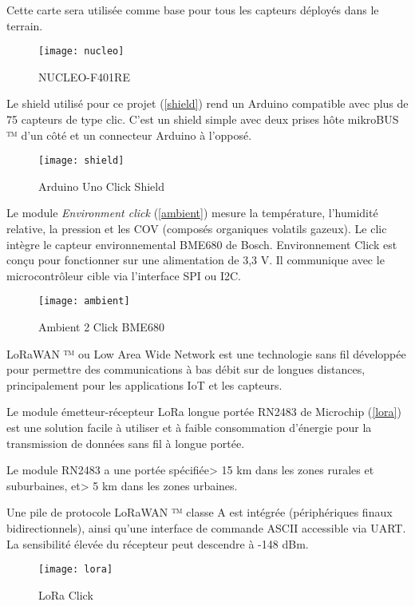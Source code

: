 Cette carte sera utilisée comme base pour tous les capteurs déployés dans le terrain.

\begin{figure}[!h]
	\centering
	\texttt{[image: nucleo]}
	\caption{NUCLEO-F401RE}
	\label{nucleo}
\end{figure}

\newpage
Le shield utilisé pour ce projet (\autoref{shield}) rend un Arduino compatible avec plus de 75 capteurs de type clic. C'est un shield simple avec deux prises hôte mikroBUS ™ d'un côté et un connecteur Arduino à l'opposé.

\begin{figure}[!h]
	\centering
	\texttt{[image: shield]}
	\caption{Arduino Uno Click Shield}
	\label{shield}
\end{figure}

Le module \textit{Environment click} (\autoref{ambient}) mesure la température, l'humidité relative, la pression et les COV (composés organiques volatils gazeux). Le clic intègre le capteur environnemental BME680 de Bosch. Environnement Click est conçu pour fonctionner sur une alimentation de 3,3 V. Il communique avec le microcontrôleur cible via l'interface SPI ou I2C.

\begin{figure}[!h]
	\centering
	\texttt{[image: ambient]}
	\caption{Ambient 2 Click BME680}
	\label{ambient}
\end{figure}

\newpage
LoRaWAN ™ ou Low Area Wide Network est une technologie sans fil développée pour permettre des communications à bas débit sur de longues distances, principalement pour les applications IoT et les capteurs.

Le module émetteur-récepteur LoRa longue portée RN2483 de Microchip (\autoref{lora}) est une solution facile à utiliser et à faible consommation d'énergie pour la transmission de données sans fil à longue portée.

Le module RN2483 a une portée spécifiée> 15 km dans les zones rurales et suburbaines, et> 5 km dans les zones urbaines.

Une pile de protocole LoRaWAN ™ classe A est intégrée (périphériques finaux bidirectionnels), ainsi qu'une interface de commande ASCII accessible via UART. La sensibilité élevée du récepteur peut descendre à -148 dBm.
\begin{figure}[!h]
	\centering
	\texttt{[image: lora]}
	\caption{LoRa Click}
	\label{lora}
\end{figure}

